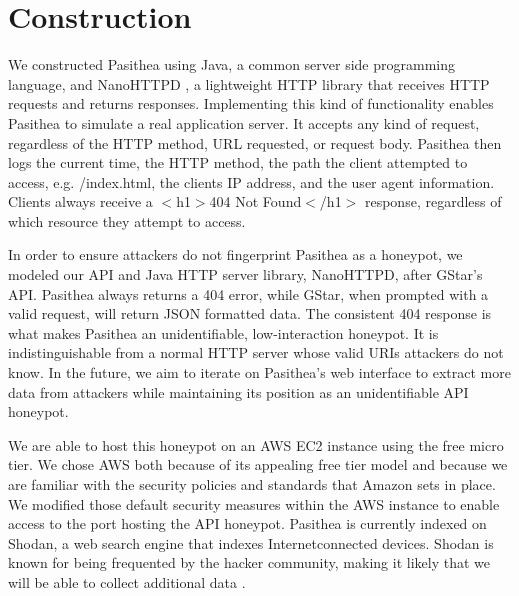 
\section{Construction} \label{construction}

We constructed Pasithea using Java, a common server side programming language, and NanoHTTPD \cite{Nanohttpd}, a lightweight HTTP library that receives HTTP requests and returns responses.  Implementing this kind of functionality enables Pasithea to simulate a real application server. It accepts any kind of request, regardless of the HTTP method, URL requested, or request body. Pasithea then logs the current time, the HTTP method, the path the client attempted to access, e.g. /index.html, the clients IP address, and the user agent information. Clients always receive a $<$h1$>$404 Not Found$<$/h1$>$ response, regardless of which resource they attempt to access.

In order to ensure attackers do not fingerprint Pasithea as a honeypot, we modeled our API and Java HTTP server library, NanoHTTPD, after GStar’s API. Pasithea always returns a 404 error, while GStar, when prompted with a valid request, will return JSON formatted data. The consistent 404 response is what makes Pasithea an unidentifiable, low-interaction honeypot. It is indistinguishable from a normal HTTP server whose valid URIs attackers do not know. In the future, we aim to iterate on Pasithea’s web interface to extract more data from attackers while maintaining its position as an unidentifiable API honeypot.

We are able to host this honeypot on an AWS EC2 instance using the free micro tier. We chose AWS both because of its appealing free tier model and because we are familiar with the security policies and standards that Amazon sets in place. We modified those default security measures within the AWS instance to enable access to the port hosting the API honeypot. Pasithea is currently indexed on Shodan, a web search engine that indexes Internetconnected devices. Shodan is known for being frequented by the hacker community, making it likely that we will be able to collect additional data \cite{unsavoryChar}.

